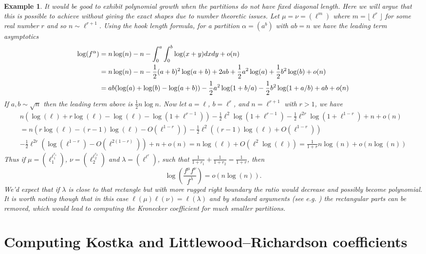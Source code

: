 \documentclass[11pt]{amsart}
\newtheorem{ex}[thm]{Example}
\theoremstyle{plain}
\theoremstyle{definition}
\numberwithin{equation}{section}
\newcommand{\la}{\lambda}
\newcommand{\al}{\alpha}
\def\la{\lambda}
\begin{document}
\begin{ex}\label{ex:rect}
It would be good to exhibit polynomial growth when the partitions do not have fixed diagonal length. Here we will argue that this is possible to achieve without giving the exact shapes due to number theoretic issues. Let $\mu=\nu=(\ell^m)$ where $m=\lfloor \ell^{r} \rfloor$ for some real number $r$ and so $n \sim \ell^{r+1}$. Using the hook length formula, for a partition $\al=(a^b)$ with $ab=n$ we have the leading term asymptotics
\begin{align*}
\log(f^\al) &= n\log(n) -n - \int_0^a \int_0^b \log(x+y) dx dy +o(n) \notag \\
&=   
n\log(n) -n - \frac12(a+b)^2 \log(a+b) +2ab +\frac12 a^2\log(a) +\frac12 b^2\log(b) +o(n)  \\
&= ab(\log(a)+\log(b)-\log(a+b)) -\frac12a^2 \log(1+b/a) - \frac12b^2\log(1+a/b) +ab +o(n) \notag
\end{align*}
If $a,b\sim \sqrt{n}$ then the leading term above is $\frac12 n \log n$. Now let $a=\ell$, $b=\ell^r$, and $n=\ell^{r+1}$ with $r>1$, we have
\begin{align*}
n\left(\log(\ell)+r\log(\ell)-\log(\ell) -\log(1+\ell^{r-1})\right) - \frac12 \ell^2 \log(1+\ell^{r-1}) -\frac12 \ell^{2r} \log(1+\ell^{1-r}) +n +o(n) \\
=n(r\log(\ell) - (r-1)\log(\ell) - O(\ell^{1-r}) ) - \frac12 \ell^2 ((r-1)\log(\ell)+O(\ell^{1-r}))\\ - \frac12 \ell^{2r} (\log(\ell^{1-r}) -O(\ell^{2(1-r)}) ) +n + o(n) 
= n\log(\ell) +O(\ell^2 \log(\ell) ) = \frac{1}{1+r} n\log(n) + o(n \log(n) )
\end{align*}
Thus if $\mu=(\ell_1^{\ell_1^{r_1}})$, $\nu=(\ell_2^{\ell_2^{r_2}})$ and $\la =(\ell^{\ell^r})$, such that $\frac{1}{1+r_1} + \frac{1}{1+r_2} = \frac{1}{1+r}$, then
$$\log\left( \frac{f^\mu f^\nu}{f^\la} \right) = o(n \log(n) ).$$
We'd expect that if $\la$ is close to that rectangle but with more rugged right boundary the ratio would decrease and possibly become polynomial. It is worth noting though that in this case $\ell(\mu)\ell(\nu) = \ell(\la)$ and by standard arguments (see e.g. \cite{IP24}) the rectangular parts can be removed, which would lead to computing the Kronecker coefficient for much smaller partitions. 
\end{ex}

\section{Computing Kostka and Littlewood--Richardson coefficients}\label{sec:kostka}
\end{document}
